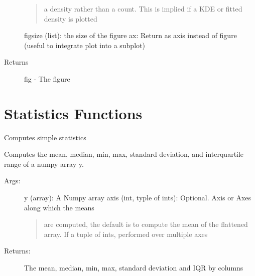 \documentclass[letterpaper,10pt,english]{sphinxmanual}
\begin{document}
\begin{fulllineitems}
\begin{description}
\begin{quote}
a density rather than a count. This is implied if a KDE or 
fitted density is plotted
\end{quote}

figsize (list): the size of the figure
ax: Return as axis instead of figure (useful to integrate plot into a subplot)

\item[{Returns}] \leavevmode
fig - The figure

\end{description}

\end{fulllineitems}



\chapter{Statistics Functions}
\label{\detokenize{Stats:statistics-functions}}\label{\detokenize{Stats::doc}}

\begin{fulllineitems}
\label{\detokenize{Stats:pyleoclim.Stats.simpleStats}}
Computes simple statistics

Computes the mean, median, min, max, standard deviation, and interquartile
range of a numpy array y.
\begin{description}
\item[{Args:}] \leavevmode
y (array): A Numpy array
axis (int, typle of ints): Optional. Axis or Axes along which the means
\begin{quote}

are computed, the default is to compute the mean of the flattened
array. If a tuple of ints, performed over multiple axes
\end{quote}

\item[{Returns:}] \leavevmode
The mean, median, min, max, standard deviation and IQR by columns

\end{description}

\end{fulllineitems}

\end{document}
